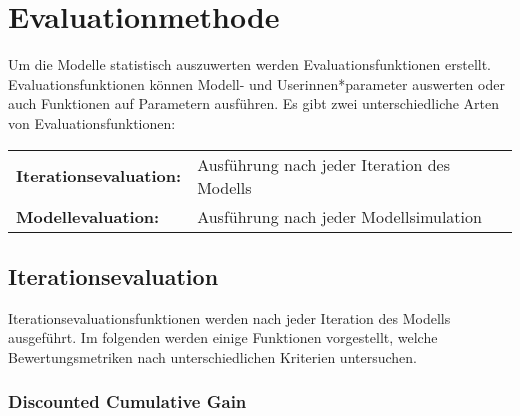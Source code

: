 \chapter{Evaluationmethode}
\label{chap:evaluationsmethode}

Um die Modelle statistisch auszuwerten werden Evaluationsfunktionen erstellt. Evaluationsfunktionen können Modell-  und Userinnen*parameter auswerten oder auch Funktionen auf Parametern ausführen.
Es gibt zwei unterschiedliche Arten von Evaluationsfunktionen: %

\begin{table}[!htbp]
	\begin{tabularx}{\textwidth}{lX}
		\textbf{Iterationsevaluation:} &  Ausführung nach jeder Iteration des Modells\\
		\textbf{Modellevaluation:} & Ausführung nach jeder Modellsimulation  \\
	\end{tabularx}
\end{table}

\section{Iterationsevaluation}
\label{sec:evaluationsfunktionen}


Iterationsevaluationsfunktionen werden nach jeder Iteration des Modells ausgeführt. Im folgenden werden einige Funktionen vorgestellt, welche Bewertungsmetriken nach unterschiedlichen Kriterien untersuchen.



\subsection{Discounted Cumulative Gain}


